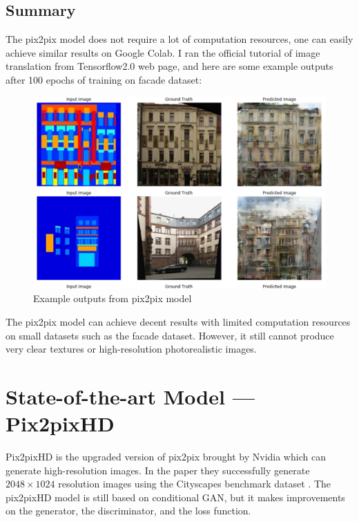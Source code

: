 \subsection{Summary}
The pix2pix model does not require a lot of computation resources, one can easily 
achieve similar results on Google Colab. I ran the official tutorial 
\cite{tf-pix2pix-tutorial} of image translation from Tensorflow2.0 web page, 
and here are some example outputs after 
100 epochs of training on facade dataset\cite{Tylecek13}:
\begin{figure}[H]
    \begin{center}
    \includegraphics[width=12cm]{figures/pix2pix-output}
    \end{center}
    \caption{Example outputs from pix2pix model}
    \label{fig:pix2pix-output}
\end{figure}

The pix2pix model can achieve decent results with limited computation resources on 
small datasets such as the facade dataset. However, it still cannot produce very
clear textures or high-resolution photorealistic images.

\section{State-of-the-art Model — Pix2pixHD}
Pix2pixHD\cite{wang2018pix2pixHD} is the upgraded version of pix2pix brought by 
Nvidia which can generate high-resolution images. In the paper they successfully 
generate $2048\times1024$ resolution images using the Cityscapes benchmark dataset
\cite{Cordts2016Cityscapes}. The pix2pixHD model is still based on conditional GAN, but
it makes improvements on the generator, the discriminator, and the loss function.

